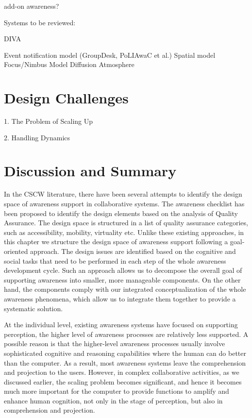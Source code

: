 add-on awareness?

Systems to be reviewed:

DIVA \cite{springerlink:10.1023/A:1008608425504}

Event notification model (GroupDesk, PoLIAwaC et al.)
Spatial model
Focus/Nimbus Model
Diffusion
Atmosphere



\section{Design Challenges} %
\label{sec:design_challenges}
1. The Problem of Scaling Up

2. Handling Dynamics



\section{Discussion and Summary} %
\label{sec:discussion_and_summary}
In the CSCW literature, there have been several attempts to identify the design space of awareness support in collaborative systems. The awareness checklist \cite{antunes2010a} has been proposed to identify the design elements based on the analysis of Quality Assurance. The design space is structured in a list of quality assurance categories, such as accessibility, mobility, virtuality etc. Unlike these existing approaches, in this chapter we structure the design space of awareness support following a goal-oriented approach. The design issues are identified based on the cognitive and social tasks that need to be performed in each step of the whole awareness development cycle. Such an approach allows us to decompose the overall goal of supporting awareness into smaller, more manageable components. On the other hand, the components comply with our integrated conceptualization of the whole awareness phenomena, which allow us to integrate them together to provide a systematic solution.

At the individual level, existing awareness systems have focused on supporting perception, the higher level of awareness processes are relatively less supported. A possible reason is that the higher-level awareness processes usually involve sophisticated cognitive and reasoning capabilities where the human can do better than the computer. As a result, most awareness systems leave the comprehension and projection to the users. However, in complex collaborative activities, as we discussed earlier, the scaling problem becomes significant, and hence it becomes much more important for the computer to provide functions to amplify and enhance human cognition, not only in the stage of perception, but also in comprehension and projection. 

